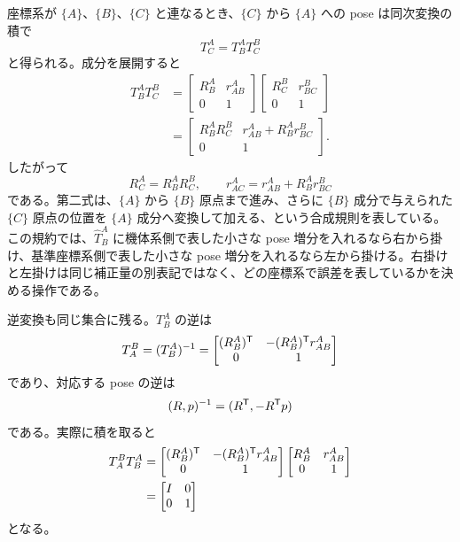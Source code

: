 座標系が $\{A\}$、$\{B\}$、$\{C\}$ と連なるとき、$\{C\}$ から $\{A\}$ への pose は同次変換の積で
\begin{equation}
  T^A_C=T^A_BT^B_C
\end{equation}
と得られる。成分を展開すると
\begin{align}
  T^A_BT^B_C
  &=
  \begin{bmatrix}
    R^A_B&r^A_{AB}\\
    0&1
  \end{bmatrix}
  \begin{bmatrix}
    R^B_C&r^B_{BC}\\
    0&1
  \end{bmatrix}\\
  &=
  \begin{bmatrix}
    R^A_BR^B_C&r^A_{AB}+R^A_Br^B_{BC}\\
    0&1
  \end{bmatrix}.
\end{align}
したがって
\begin{equation}
  R^A_C=R^A_BR^B_C,\qquad
  r^A_{AC}=r^A_{AB}+R^A_Br^B_{BC}
\end{equation}
である。第二式は、$\{A\}$ から $\{B\}$ 原点まで進み、さらに $\{B\}$ 成分で与えられた $\{C\}$ 原点の位置を $\{A\}$ 成分へ変換して加える、という合成規則を表している。この規約では、$\hat{T}^A_B$ に機体系側で表した小さな pose 増分を入れるなら右から掛け、基準座標系側で表した小さな pose 増分を入れるなら左から掛ける。右掛けと左掛けは同じ補正量の別表記ではなく、どの座標系で誤差を表しているかを決める操作である。

逆変換も同じ集合に残る。$T^A_B$ の逆は
\begin{equation}
  T^B_A=(T^A_B)^{-1}
  =
  \begin{bmatrix}
    (R^A_B)^{\mathsf{T}}&-(R^A_B)^{\mathsf{T}} r^A_{AB}\\
    0&1
  \end{bmatrix}
\end{equation}
であり、対応する pose の逆は
\begin{equation}
  (R,p)^{-1}=(R^{\mathsf{T}},-R^{\mathsf{T}} p)
\end{equation}
である。実際に積を取ると
\begin{align}
  T^B_AT^A_B
  &=
  \begin{bmatrix}
    (R^A_B)^{\mathsf{T}}&-(R^A_B)^{\mathsf{T}} r^A_{AB}\\
    0&1
  \end{bmatrix}
  \begin{bmatrix}
    R^A_B&r^A_{AB}\\
    0&1
  \end{bmatrix}\\
  &=
  \begin{bmatrix}
    I&0\\
    0&1
  \end{bmatrix}
\end{align}
となる。


